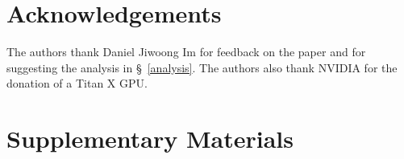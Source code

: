 \documentclass[10pt,twocolumn,letterpaper]{article}
\begin{document}
\newpage

\section*{Acknowledgements}
{\small
The authors thank Daniel Jiwoong Im for feedback on the paper and for suggesting
the analysis in \S~\ref{analysis}. The authors also thank NVIDIA for the
donation of a Titan X GPU.}

{\small


}

\clearpage

\appendix
\onecolumn
\section{Supplementary Materials}
\end{document}
